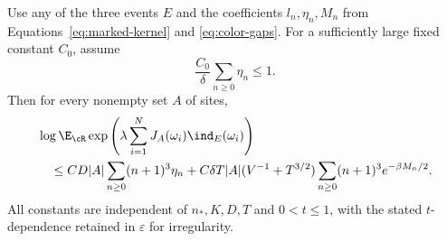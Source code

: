 \begin{proposition}\label{prop:trajectory-moment}
Use any of the three events $E$ and the coefficients
$l_n,\eta_n,M_n$ from Equations~\eqref{eq:marked-kernel}
and \eqref{eq:color-gaps}.  For a sufficiently large
fixed constant $C_0$, assume
\begin{equation}\label{eq:color-smallness}
 \frac{C_0}{\delta}\sum_{n\ge0}\eta_n\le1.
\end{equation}
Then for every nonempty set $A$ of sites,
\begin{align}
 &\log\E_{\cR}\exp\left(
       \lambda\sum_{i=1}^N J_A(\omega_i)\ind_E(\omega_i)\right)
 \notag\\
 &\quad\le
 CD|A|\sum_{n\ge0}(n+1)^3\eta_n
 +C\delta T|A|(V^{-1}+T^{3/2})
          \sum_{n\ge0}(n+1)^3e^{-\beta M_n/2}.
 \label{eq:trajectory-moment}
\end{align}
All constants are independent of $n_*,K,D,T$ and
$0<t\le1$, with the stated $t$-dependence retained in
$\varepsilon$ for irregularity.
\end{proposition}

